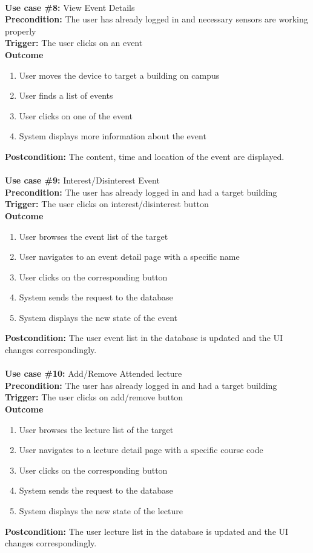 \documentclass[12pt]{article}
\begin{document}
\noindent\\
\textbf{Use case \#8:} View Event Details\\
\textbf{Precondition:} The user has already logged in and necessary sensors are working properly\\
\textbf{Trigger:} The user clicks on an event\\
\textbf{Outcome}
\begin{enumerate}
	\item User moves the device to target a building on campus
    \item User finds a list of events
    \item User clicks on one of the event
    \item System displays more information about the event
\end{enumerate}
\textbf{Postcondition:} The content, time and location of the event are displayed.\\


\noindent\\
\textbf{Use case \#9:} Interest/Disinterest Event\\
\textbf{Precondition:} The user has already logged in and had a target building\\
\textbf{Trigger:} The user clicks on interest/disinterest button\\
\textbf{Outcome}
\begin{enumerate}
	\item User browses the event list of the target
	\item User navigates to an event detail page with a specific name
	\item User clicks on the corresponding button
    \item System sends the request to the database
    \item System displays the new state of the event
\end{enumerate}
\textbf{Postcondition:} The user event list in the database is updated and the UI changes correspondingly.\\


\noindent\\
\textbf{Use case \#10:} Add/Remove Attended lecture\\
\textbf{Precondition:} The user has already logged in and had a target building\\
\textbf{Trigger:} The user clicks on add/remove button\\
\textbf{Outcome}
\begin{enumerate}
	\item User browses the lecture list of the target
	\item User navigates to a lecture detail page with a specific course code
	\item User clicks on the corresponding button
    \item System sends the request to the database
    \item System displays the new state of the lecture
\end{enumerate}
\textbf{Postcondition:} The user lecture list in the database is updated and the UI changes correspondingly.\\
\end{document}
